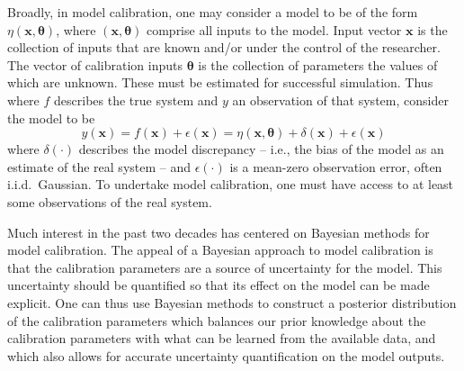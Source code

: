 \documentclass{article}
\begin{document}
Broadly, in model calibration, one may consider a model to be of the form $\eta(\mathbf x,\boldsymbol \theta)$, where $(\mathbf x,\boldsymbol \theta)$ comprise all inputs to the model. 
%
Input vector $\mathbf x$ is the collection of inputs that are known and/or under the control of the researcher.
%
The vector of calibration inputs $\boldsymbol \theta$ is the collection of parameters the values of which are unknown. 
%
These must be estimated for successful simulation. 
%
Thus where $f$ describes the true system and $y$ an observation of that system, consider the model to be 
%
\begin{equation} \label{eq:model_gen}
y(\mathbf x)=f(\mathbf x)+\epsilon(\mathbf x)=\eta(\mathbf x,\boldsymbol \theta) + \delta(\mathbf x)+\epsilon(\mathbf x)
\end{equation} 
%
where $\delta(\cdot)$ describes the model discrepancy -- i.e., the bias of the model as an estimate of the real system -- and $\epsilon(\cdot)$ is a mean-zero observation error, often i.i.d.\ Gaussian. 
%
%
To undertake model calibration, one must have access to at least some observations of the real system.%

Much interest in the past two decades has centered on Bayesian methods for model calibration. 
%
The appeal of a Bayesian approach to model calibration is that the calibration parameters are a source of uncertainty for the model. 
%
This uncertainty should be quantified so that its effect on the model can be made explicit. 
%
One can thus use Bayesian methods to construct a posterior distribution of the calibration parameters which balances our prior knowledge about the calibration parameters with what can be learned from the available data, and which also allows for accurate uncertainty quantification on the model outputs. 
\end{document}
